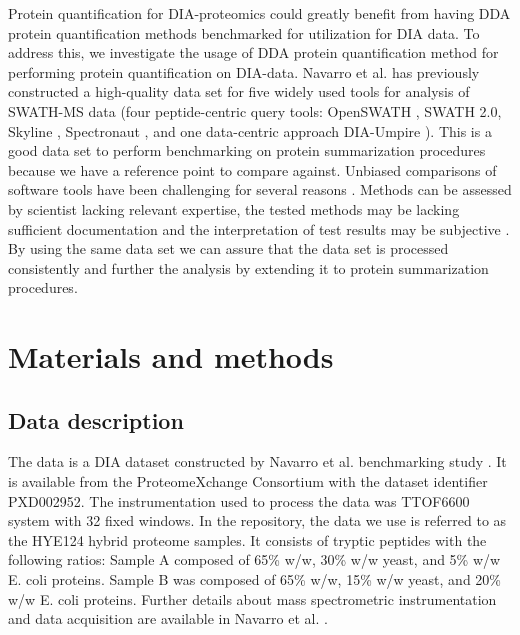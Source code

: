 \documentclass[10pt,letterpaper]{article}
\begin{document}
Protein quantification for DIA-proteomics could greatly benefit from having DDA protein quantification methods benchmarked for utilization for DIA data. To address this, we investigate the usage of DDA protein quantification method for performing protein quantification on DIA-data. Navarro et al. \cite{navarro2016multicenter} has previously constructed a high-quality data set for five widely used tools for analysis of SWATH-MS data (four peptide-centric query tools: OpenSWATH \cite{rost2014openswath}, SWATH 2.0, Skyline \cite{maclean2010skyline}, Spectronaut \cite{bruderer2015extending}, and one data-centric approach DIA-Umpire \cite{maclean2010skyline}). This is a good data set to perform benchmarking on protein summarization procedures because we have a reference point to compare against. Unbiased comparisons of software tools have been challenging for several reasons \cite{dufresne2014abrf}. Methods can be assessed by scientist lacking relevant expertise, the tested methods may be lacking sufficient documentation and the interpretation of test results may be subjective \cite{yates2012toward} \cite{leprevost2014best} \cite{pak2013clustering} \cite{faircomparison2015}. By using the same data set we can assure that the data set is processed consistently and further the analysis by extending it to protein summarization procedures.


\section*{Materials and methods}
\subsection*{Data description}

The data is a DIA dataset constructed by Navarro et al. benchmarking study \cite{navarro2016multicenter}. It is available from the ProteomeXchange Consortium with the dataset identifier PXD002952. The instrumentation used to process the data was TTOF6600 system with 32 fixed windows. In the repository, the data we use is referred to as the HYE124 hybrid proteome samples. It consists of tryptic peptides with the following ratios: Sample A composed of 65\% w/w, 30\% w/w yeast, and 5\% w/w E. coli proteins. Sample B was composed of 65\% w/w, 15\% w/w yeast, and 20\% w/w E. coli proteins. Further details about mass spectrometric instrumentation and data acquisition are available in Navarro et al. \cite{navarro2016multicenter}.    
\end{document}

